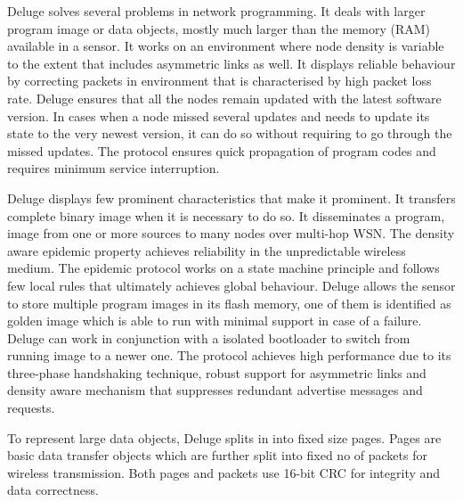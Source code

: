 \documentclass[conference,final]{IEEEtran}
\begin{document}
Deluge solves several problems in network programming. 
It deals with larger program image or data objects, mostly much larger than the memory (RAM) available in a sensor.
It works on an environment where node density is variable to the extent that includes asymmetric links as well.
It displays reliable behaviour by correcting packets in environment that is characterised by high packet loss rate.
Deluge ensures that all the nodes remain updated with the latest software version.
In cases when a node missed several updates and needs to update its state to the very newest version, it can do so without requiring to go through the missed updates.
The protocol ensures quick propagation of program codes and requires minimum service interruption. 

Deluge displays few prominent characteristics that make it prominent.
It transfers complete binary image when it is necessary to do so. 
It disseminates a program, image from one or more sources to many nodes over multi-hop WSN.
The density aware epidemic property achieves reliability in the unpredictable wireless medium.
The epidemic protocol works on a state machine principle and follows few local rules that ultimately achieves global behaviour.
Deluge allows the sensor to store multiple program images in its flash memory, one of them is identified as golden image which is able to run with minimal support in case of a failure.
Deluge can work in conjunction with a isolated bootloader to switch from running image to a newer one.
The protocol achieves high performance due to its three-phase handshaking technique, robust support for asymmetric links and density aware mechanism that suppresses redundant advertise messages and requests. 

To represent large data objects, Deluge splits in into fixed size pages.
Pages are basic data transfer objects which are further split into fixed no of packets for wireless transmission.
Both pages and packets use 16-bit CRC for integrity and data correctness.
\end{document}
